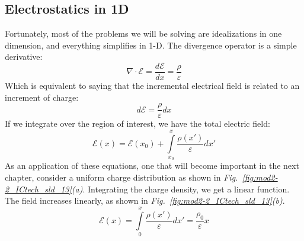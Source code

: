 \subsection{Electrostatics in 1D}
Fortunately, most of the problems we will be solving are idealizations in one dimension, and everything simplifies in 1-D.  The divergence operator is a simple derivative:
    \begin{equation} 
        \nabla  \cdot \mathcal{E} = \frac{{d\mathcal{E}}}{{dx}} = \frac{\rho }{\varepsilon } 
    \end{equation}
Which is equivalent to saying that the incremental electrical field is related to an increment of charge:
    \begin{equation} 
        d\mathcal{E} = \frac{\rho }{\varepsilon }dx 
    \end{equation}
If we integrate over the region of interest, we have the total electric field:
    \begin{equation} 
        \mathcal{E}(x) = \mathcal{E}({x_0}) + \int\limits_{{x_0}}^x {\frac{{\rho (x')}}{\varepsilon }} dx'
    \end{equation}
As an application of these equations, one that will become important in the next chapter, consider a uniform charge distribution as shown in \emph{Fig.~\ref{fig:mod2-2_ICtech_sld_13}(a)}.  Integrating the charge density, we get a linear function.  The field increases linearly, as shown in \emph{Fig.~\ref{fig:mod2-2_ICtech_sld_13}(b)}.
    \begin{equation} 
        \mathcal{E}(x) = \int\limits_0^x {\frac{{\rho (x')}}{\varepsilon}} dx' = \frac{{{\rho _0}}}{\varepsilon}x 
    \end{equation}
